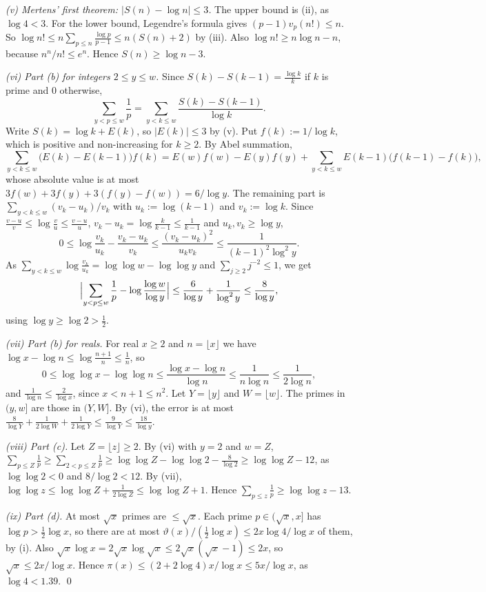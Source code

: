 \documentclass[11pt]{amsart}
\theoremstyle{definition}
\begin{document}
\emph{(v) Mertens' first theorem: $|S(n)-\log n|\le3$.} The upper bound is (ii), as $\log4<3$. For the lower bound, Legendre's formula gives $(p-1)v_p(n!)\le n$. So $\log n!\le n\sum_{p\le n}\frac{\log p}{p-1}\le n(S(n)+2)$ by (iii). Also $\log n!\ge n\log n-n$, because $n^n/n!\le e^n$. Hence $S(n)\ge\log n-3$.

\emph{(vi) Part (b) for integers $2\le y\le w$.} Since $S(k)-S(k-1)=\frac{\log k}k$ if $k$ is prime and $0$ otherwise,
\[
\sum_{y<p\le w}\frac1p=\sum_{y<k\le w}\frac{S(k)-S(k-1)}{\log k}.
\]
Write $S(k)=\log k+E(k)$, so $|E(k)|\le3$ by (v). Put $f(k):=1/\log k$, which is positive and non-increasing for $k\ge2$. By Abel summation,
\[
\sum_{y<k\le w}\bigl(E(k)-E(k-1)\bigr)f(k)=E(w)f(w)-E(y)f(y)+\sum_{y<k\le w}E(k-1)\bigl(f(k-1)-f(k)\bigr),
\]
whose absolute value is at most $3f(w)+3f(y)+3(f(y)-f(w))=6/\log y$. The remaining part is $\sum_{y<k\le w}(v_k-u_k)/v_k$ with $u_k:=\log(k-1)$ and $v_k:=\log k$. Since $\frac{v-u}v\le\log\frac vu\le\frac{v-u}u$, $v_k-u_k=\log\frac k{k-1}\le\frac1{k-1}$ and $u_k,v_k\ge\log y$,
\[
0\le\log\frac{v_k}{u_k}-\frac{v_k-u_k}{v_k}\le\frac{(v_k-u_k)^2}{u_kv_k}\le\frac1{(k-1)^2\log^2y}.
\]
As $\sum_{y<k\le w}\log\frac{v_k}{u_k}=\log\log w-\log\log y$ and $\sum_{j\ge2}j^{-2}\le1$, we get
\[
\Bigl|\sum_{y<p\le w}\frac1p-\log\frac{\log w}{\log y}\Bigr|\le\frac6{\log y}+\frac1{\log^2y}\le\frac8{\log y},
\]
using $\log y\ge\log2>\frac12$.

\emph{(vii) Part (b) for reals.} For real $x\ge2$ and $n=\lfloor x\rfloor$ we have $\log x-\log n\le\log\frac{n+1}n\le\frac1n$, so
\[
0\le\log\log x-\log\log n\le\frac{\log x-\log n}{\log n}\le\frac1{n\log n}\le\frac1{2\log n},
\]
and $\frac1{\log n}\le\frac2{\log x}$, since $x<n+1\le n^2$. Let $Y=\lfloor y\rfloor$ and $W=\lfloor w\rfloor$. The primes in $(y,w]$ are those in $(Y,W]$. By (vi), the error is at most $\frac8{\log Y}+\frac1{2\log W}+\frac1{2\log Y}\le\frac9{\log Y}\le\frac{18}{\log y}$.

\emph{(viii) Part (c).} Let $Z=\lfloor z\rfloor\ge2$. By (vi) with $y=2$ and $w=Z$, $\sum_{p\le Z}\frac1p\ge\sum_{2<p\le Z}\frac1p\ge\log\log Z-\log\log2-\frac8{\log2}\ge\log\log Z-12$, as $\log\log2<0$ and $8/\log2<12$. By (vii), $\log\log z\le\log\log Z+\frac1{2\log Z}\le\log\log Z+1$. Hence $\sum_{p\le z}\frac1p\ge\log\log z-13$.

\emph{(ix) Part (d).} At most $\sqrt x$ primes are $\le\sqrt x$. Each prime $p\in(\sqrt x,x]$ has $\log p>\frac12\log x$, so there are at most $\vartheta(x)/(\frac12\log x)\le2x\log4/\log x$ of them, by (i). Also $\sqrt x\log x=2\sqrt x\log\sqrt x\le2\sqrt x(\sqrt x-1)\le2x$, so $\sqrt x\le2x/\log x$. Hence $\pi(x)\le(2+2\log4)x/\log x\le5x/\log x$, as $\log4<1.39$. \qed
\end{document}
